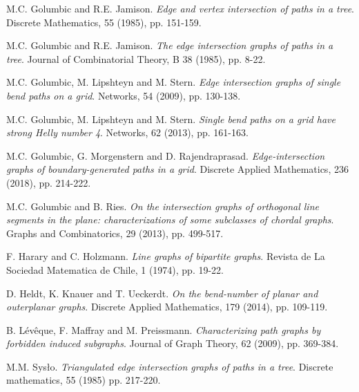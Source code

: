 \documentclass{dmgt}
\begin{document}
\begin{thebibliography}{99}
M.C. Golumbic and R.E. Jamison. \emph{Edge and vertex intersection of paths in a tree}. Discrete Mathematics, 55 (1985), pp. 151-159.

M.C. Golumbic and R.E. Jamison. \emph{The edge intersection graphs of paths in a tree}. Journal of Combinatorial Theory, B 38 (1985), pp. 8-22.

M.C. Golumbic, M. Lipshteyn and  M. Stern. \emph{Edge intersection graphs of single bend paths on a grid}. Networks, 54 (2009), pp. 130-138. 

M.C. Golumbic, M. Lipshteyn and M. Stern. \emph{Single bend paths on a grid have strong {H}elly number 4}. Networks, 62 (2013), pp. 161-163.

M.C. Golumbic, G. Morgenstern and D. Rajendraprasad. \emph{Edge-intersection graphs of boundary-generated paths in a grid}. Discrete Applied Mathematics, 236 (2018), pp. 214-222.

M.C. Golumbic and B. Ries. \emph{On the intersection graphs of orthogonal line segments in the plane: characterizations of some subclasses of chordal graphs}. Graphs and Combinatorics, 29 (2013), pp. 499-517.

F. Harary and C. Holzmann. \emph{Line graphs of bipartite graphs}. Revista de La Sociedad Matematica de Chile, 1 (1974), pp. 19-22.

D. Heldt, K. Knauer and T. Ueckerdt. \emph{On the bend-number of planar and outerplanar graphs}. Discrete Applied Mathematics, 179 (2014), pp. 109-119.
  
  B. L{\'e}v{\^e}que, F. Maffray  and M. Preissmann. \emph{Characterizing path graphs by forbidden induced subgraphs}. Journal of Graph Theory, 62 (2009), pp. 369-384.


  M.M. Sys{\l}o. \emph{Triangulated edge intersection graphs of paths in a tree}. Discrete mathematics,  55 (1985)  pp. 217-220.
\end{thebibliography}
\end{document}
